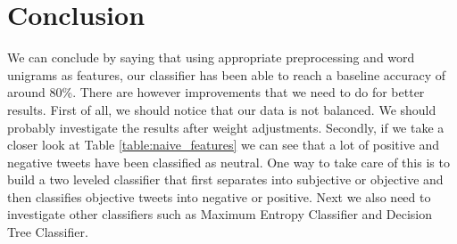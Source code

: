 \section{Conclusion}
We can conclude by saying that using appropriate preprocessing and word unigrams as features,
	our classifier has been able to reach a baseline accuracy of around 80\%.
There are however improvements that we need to do for better results.
First of all, we should notice that our data is not balanced.
We should probably investigate the results after weight adjustments.
Secondly, if we take a closer look at Table \ref{table:naive_features} we can see that a lot of
	positive and negative tweets have been classified as neutral.
One way to take care of this is to build a two leveled classifier that first separates into
	subjective or objective and then classifies objective tweets into negative or positive.
Next we also need to investigate other classifiers such as Maximum Entropy Classifier and Decision Tree Classifier.
